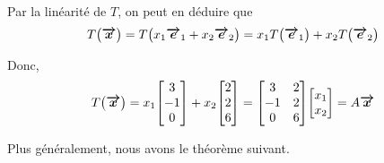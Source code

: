 \documentclass{article}
\begin{document}
{{        Par la linéarité de $T$, on peut en déduire que 
        \[T\left(\bvec{x}\right) = T\left(x_1 \bvec{e}_1 + x_2 \bvec{e}_2\right)= x_1 T\left(\bvec{e}_1\right) + x_2 T\left(\bvec{e}_2\right)\]
        
        Donc, 
        \[T\left(\bvec{x}\right) = x_1 \begin{bmatrix} 3 \\ -1 \\ 0 \end{bmatrix} + x_2 \begin{bmatrix} 2 \\ 2 \\ 6 \end{bmatrix} = \begin{bmatrix} 3 & 2 \\ -1 & 2 \\ 0 & 6 \end{bmatrix} \begin{bmatrix} x_1 \\ x_2 \end{bmatrix} = A \bvec{x}\]
    }
    
    Plus généralement, nous avons le théorème suivant.
}
\end{document}
